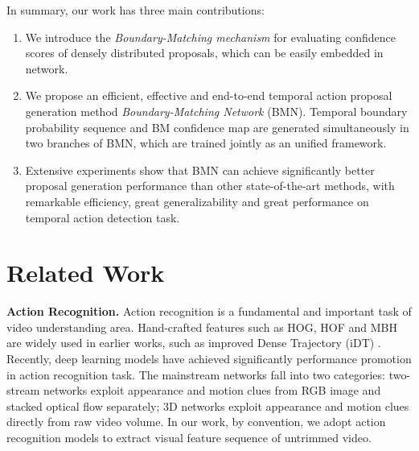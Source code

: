 \documentclass[10pt,twocolumn,letterpaper]{article}
\begin{document}
In summary, our work has three main contributions:

\begin{enumerate}
\setlength{\itemsep}{0pt}
\setlength{\parsep}{0pt}
\setlength{\parskip}{0pt}

\item We introduce the \emph{Boundary-Matching mechanism} for evaluating confidence scores  of densely distributed proposals, which can be easily embedded in network.

\item We propose an efficient, effective and end-to-end temporal action proposal generation method \emph{Boundary-Matching Network} (BMN). Temporal boundary probability sequence and BM confidence map are generated simultaneously in two branches of BMN, which are trained jointly as an unified framework.

\item Extensive experiments show that BMN can achieve significantly better proposal generation performance than other state-of-the-art methods, with remarkable efficiency, great generalizability and great performance on temporal action detection task.
 
\end{enumerate}



\section{Related Work}

\noindent
\textbf{Action Recognition.}
Action recognition is a fundamental and important task of video understanding area.
Hand-crafted features such as HOG, HOF and MBH are widely used in earlier works, such as improved Dense Trajectory (iDT) \cite{dtf,wang2013action}.
Recently, deep learning models have achieved significantly performance promotion in action recognition task. 
The mainstream networks fall into two categories: two-stream networks \cite{feichtenhofer2016convolutional,simonyan2014two,wang2015towards} exploit appearance and motion clues from RGB image and stacked optical flow separately; 3D networks \cite{tran2015learning,qiu2017learning}  exploit appearance and motion clues directly from raw video volume.
In our work, by convention, we adopt action recognition models to extract visual feature sequence of untrimmed video. 
\end{document}
